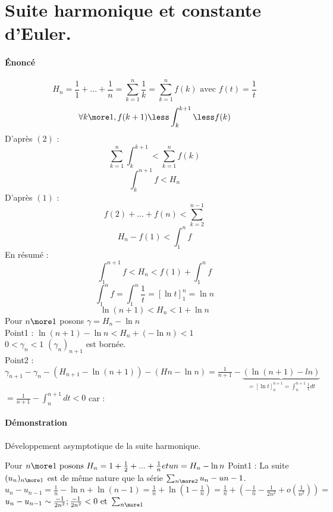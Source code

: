 \section{Suite harmonique et constante d'Euler.}
	\paragraph{Énoncé}
\[H_{n} = \frac{1}{1} + ... + \frac{1}{n} = \sum_{k = 1}^{n}\frac{1}{k} = \sum_{k = 1}^{n}f(k) \text{ avec } f(t) = \frac{1}{t}\]
\[\forall{k} \more 1, f( k + 1) \less \int_{k}^{k + 1} \less f(k)\]
D'après \((2)\) :
\[\sum_{k = 1}^{n}\int_{k}^{k + 1} \less \sum_{k = 1}^{n}f(k)\]
\[\int_{k}^{n + 1}f \less H_{n}\]
D'après \((1)\) :
\[f(2) + ... + f(n) \less \sum_{k = 2}^{n - 1}\]
\[H_{n} - f(1) \less \int_{1}^{n}f \]
En résumé :
\[\int_{1}^{n+1}f \less H_{n} \less f(1) + \int_{1}^{n}f\]
\[\int_{1}^{n}f = \int_{1}^{n}\frac{1}{t} = [\ln t]_{1}^{n} = \ln n\]
\[\ln(n + 1) \less H_{n} \less 1 + \ln n\]
Pour \(n \more 1\) posons \(\gamma = H_{n} - \ln n\)\\
Point1 : \(\ln(n + 1) - \ln n \less H_{n} + (-\ln n) \less 1\)\\
\(0 \less \gamma_{n} \less 1\)   \((\gamma_{n})_{n + 1}\) est bornée.\\
Point2 : \(\gamma_{n + 1} - \gamma_{n} - (H_{n + 1} - \ln(n + 1)) - (H{n} - \ln n) = \frac{1}{n + 1} - \underbrace{(\ln(n + 1)-ln)}_{ = [\ln t]_{n}^{n + 1} = \int_{n}^{n + 1}\frac{1}{t}dt}\)\\
\(= \frac{1}{n + 1} - \int_{n}^{n + 1}dt \less 0\) car :

\paragraph{Démonstration}
Développement asymptotique de la suite harmonique.

Pour \(n \more 1 \text{ posons }H_{n} = 1 + \frac{1}{2} + ... + \frac{1}{n} et u{n} = H_{n} - \ln n \)
Point1 : La suite \((u_{n})_{n \more 1}\) est de même nature que la série \( \sum_{n \more 2}u_{n} - u{n - 1}\).
\(u_{n} - u_{n - 1} = \frac{1}{n} - \ln n + \ln(n - 1) = \frac{1}{n} + \ln(1 - \frac{1}{n}) = \frac{1}{n} + ( - \frac{1}{n} - \frac{1}{2n^{2}} + o(\frac{1}{n^{2}})) = \)\\ %
\(u_{n} - u_{n - 1}\sim \frac{-1}{2n^{2}} ; \frac{-1}{2n^{2}} < 0\text{ et } \sum_{n \more 1}\)
